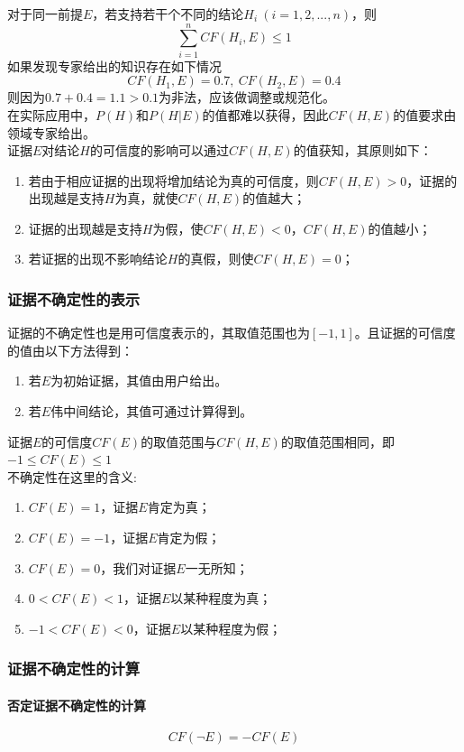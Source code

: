 \documentclass[12pt]{article}
\begin{document}
对于同一前提$E$，若支持若干个不同的结论$H_i\ (i=1,2,...,n)$，则
$$\sum_{i=1}^nCF(H_i,E)\leq 1$$
如果发现专家给出的知识存在如下情况
$$CF(H_1,E)=0.7,\ CF(H_2,E)=0.4$$
则因为$0.7+0.4=1.1>0.1$为非法，应该做调整或规范化。\\
在实际应用中，$P(H)$和$P(H|E)$的值都难以获得，因此$CF(H,E)$的值要求由领域专家给出。\\
证据$E$对结论$H$的可信度的影响可以通过$CF(H,E)$的值获知，其原则如下：
\begin{enumerate}
	\item{若由于相应证据的出现将增加结论为真的可信度，则$CF(H,E)>0$，证据的出现越是支持$H$为真，就使$CF(H,E)$的值越大；}
	\item{证据的出现越是支持$H$为假，使$CF(H,E)<0$，$CF(H,E)$的值越小；}
	\item{若证据的出现不影响结论$H$的真假，则使$CF(H,E)=0$；}
\end{enumerate}
\subsubsection{证据不确定性的表示}
证据的不确定性也是用可信度表示的，其取值范围也为$[-1,1]$。且证据的可信度的值由以下方法得到：
\begin{enumerate}
	\item{若$E$为初始证据，其值由用户给出。}
	\item{若$E$伟中间结论，其值可通过计算得到。}
\end{enumerate}
证据$E$的可信度$CF(E)$的取值范围与$CF(H,E)$的取值范围相同，即$-1\leq CF(E)\leq 1$\\
不确定性在这里的含义:
\begin{enumerate}
	\item{$CF(E)=1$，证据$E$肯定为真；}
	\item{$CF(E)=-1$，证据$E$肯定为假；}
	\item{$CF(E)=0$，我们对证据$E$一无所知；}
	\item{$0<CF(E)<1$，证据$E$以某种程度为真；}
	\item{$-1<CF(E)<0$，证据$E$以某种程度为假；}
\end{enumerate}
\subsubsection{证据不确定性的计算}
\paragraph{否定证据不确定性的计算}
$$CF(\neg{E})=-CF(E)$$
\end{document}
